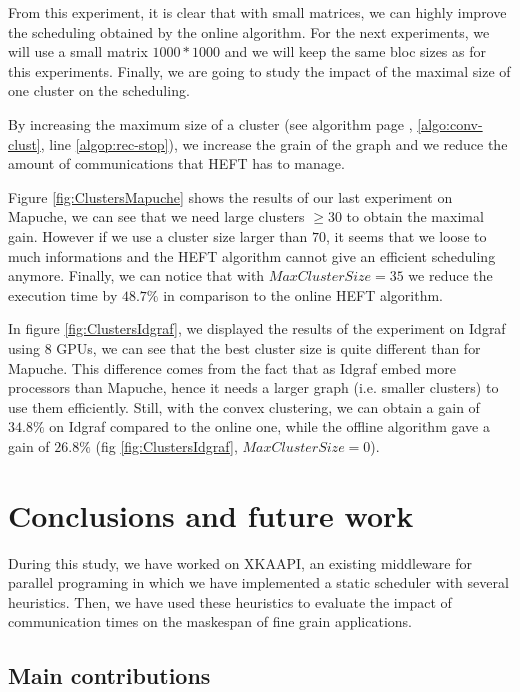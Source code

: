 \documentclass[10pt, conference, compsocconf,pdftex,dvipsnames]{IEEEtran}
\begin{document}
From this experiment, it is clear that with small matrices, we can highly
improve the scheduling obtained by the online algorithm. For the next
experiments, we will use a small matrix $1000*1000$ and we will keep the same
bloc sizes as for this experiments. Finally, we are going to study the impact
of the maximal size of one cluster on the scheduling.

By increasing the maximum size of a cluster (see algorithm
page \pageref{algo:conv-clust}, \ref{algo:conv-clust}, line
\ref{algop:rec-stop}), we increase the grain of the graph and we reduce the
amount of communications that HEFT has to manage.

Figure \ref{fig:ClustersMapuche} shows the results of our last experiment on
Mapuche, we can see that we need large clusters $\geq 30$ to obtain the maximal
gain. However if we use a cluster size larger than $70$, it seems that we
loose to much informations and the HEFT algorithm cannot give an efficient
scheduling anymore. Finally, we can notice that with $MaxClusterSize=35$ we
reduce the execution time by $48.7\%$ in comparison to the online HEFT
algorithm.

In figure \ref{fig:ClustersIdgraf}, we displayed the results of the
experiment on Idgraf using $8$ GPUs, we can see that the best cluster size is
quite different than for Mapuche. This difference comes from the fact that as
Idgraf embed more processors than Mapuche, hence it needs a larger graph (i.e.
smaller clusters) to use them efficiently. Still, with the convex clustering,
we can obtain a gain of $34.8\%$ on Idgraf compared to the online one, while
the offline algorithm gave a gain of $26.8\%$ (fig
\ref{fig:ClustersIdgraf}, $MaxClusterSize=0$).



\section{Conclusions and future work}
\label{sec:cncl}
During this study, we have worked on
XKAAPI\cite{gautier2007kaapi,gautierxkaapi}, an existing middleware for
parallel programing in which we have implemented a static scheduler with
several heuristics. Then, we have used these heuristics to evaluate the impact
of communication times on the maskespan of fine grain applications.

\subsection{Main contributions}
\label{chap:cncl-contrib}
\end{document}
